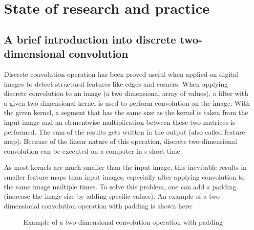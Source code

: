 \chapter{State of research and practice}
\label{ch:state}

\section{A brief introduction into discrete two-dimensional convolution}

Discrete convolution operation has been proved useful when applied on digital images to detect structural features like edges and corners. When applying discrete convolution to an image (a two dimensional array of values), a filter with a given two dimensional kernel is used to perform convolution on the image. With the given kernel, a segment that has the same size as the kernel is taken from the input image and an elementwise multiplication between these two matrices is performed. The sum of the results gets written in the output (also called feature map). Because of the linear nature of this operation, discrete two-dimensional convolution can be executed on a computer in s short time. \cite{CNN}

As most kernels are much smaller than the input image, this inevitable results in smaller feature maps than input images, especially after applying convolution to the same image multiple times. To solve this problem, one can add a padding (increase the image size by adding specific values). An example of a two dimensional convolution operation with padding is shown here:

\begin{figure}[H]
	\caption{\label{fig:convolution} Example of a two dimensional convolution operation with padding}
\end{figure}

